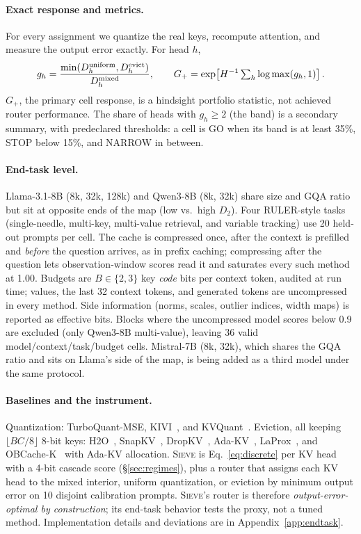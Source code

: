 \documentclass{article}
\newcommand{\sieve}{\textsc{Sieve}}
\newcommand{\gplus}{G_{+}}
\theoremstyle{definition}
\begin{document}
\paragraph{Exact response and metrics.}
For every assignment we quantize the real keys, recompute attention, and measure the output error exactly.  For head $h$,
\begin{equation}
 g_h=\frac{\min(D_h^{\rm uniform},D_h^{\rm evict})}{D_h^{\rm mixed}},
 \qquad
 \gplus=\exp\!\left[H^{-1}\textstyle\sum_h\log\max(g_h,1)\right].
 \label{eq:metrics}
\end{equation}
$\gplus$, the primary cell response, is a hindsight portfolio statistic, not achieved router performance.  The share of heads with $g_h\ge2$ (the band) is a secondary summary, with predeclared thresholds: a cell is GO when its band is at least 35\%, STOP below 15\%, and NARROW in between.

\paragraph{End-task level.}
Llama-3.1-8B (8k, 32k, 128k) and Qwen3-8B (8k, 32k) share size and GQA ratio but sit at opposite ends of the map (low vs.\ high $D_2$).  Four RULER-style tasks~\citep{hsieh2024ruler} (single-needle, multi-key, multi-value retrieval, and variable tracking) use 20 held-out prompts per cell.  The cache is compressed once, after the context is prefilled and \emph{before} the question arrives, as in prefix caching; compressing after the question lets observation-window scores read it and saturates every such method at 1.00.  Budgets are $B\in\{2,3\}$ key \emph{code} bits per context token, audited at run time; values, the last 32 context tokens, and generated tokens are uncompressed in every method.  Side information (norms, scales, outlier indices, width maps) is reported as effective bits.  Blocks where the uncompressed model scores below 0.9 are excluded (only Qwen3-8B multi-value), leaving 36 valid model/context/task/budget cells.  Mistral-7B (8k, 32k), which shares the GQA ratio and sits on Llama's side of the map, is being added as a third model under the same protocol.

\paragraph{Baselines and the instrument.}
Quantization: TurboQuant-MSE, KIVI~\citep{liu2024kivi}, and KVQuant~\citep{hooper2024kvquant}.  Eviction, all keeping $\lfloor BC/8\rfloor$ 8-bit keys: H2O~\citep{zhang2023h2o}, SnapKV~\citep{li2024snapkv}, DropKV~\citep{zhang2026dropkv}, Ada-KV~\citep{feng2024adakv}, LaProx~\citep{mai2026laprox}, and OBCache-K~\citep{gu2026obcache} with Ada-KV allocation.  \sieve{} is Eq.~\ref{eq:discrete} per KV head with a 4-bit cascade score (\S\ref{sec:regimes}), plus a router that assigns each KV head to the mixed interior, uniform quantization, or eviction by minimum output error on 10 disjoint calibration prompts.  \sieve{}'s router is therefore \emph{output-error-optimal by construction}; its end-task behavior tests the proxy, not a tuned method.  Implementation details and deviations are in Appendix~\ref{app:endtask}.
\end{document}
